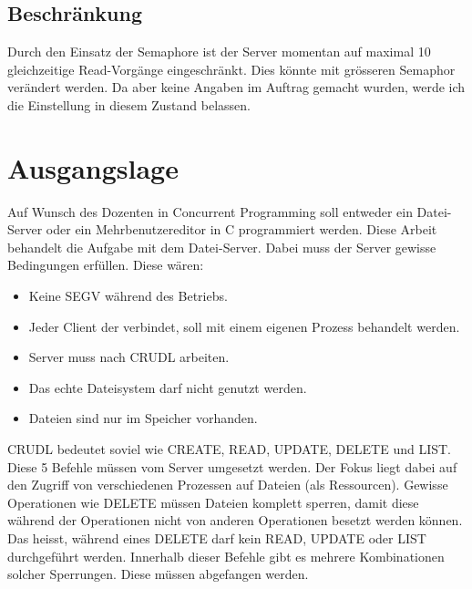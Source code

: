 \documentclass[12pt,a4paper,ngerman]{report}
\begin{document}
\section{Beschränkung}
Durch den Einsatz der Semaphore ist der Server momentan auf maximal 10 gleichzeitige Read-Vorgänge eingeschränkt. Dies könnte mit grösseren Semaphor verändert werden. Da aber keine Angaben im Auftrag gemacht wurden, werde ich die Einstellung in diesem Zustand belassen.
\chapter{Ausgangslage}
Auf Wunsch des Dozenten in Concurrent Programming soll entweder ein Datei-Server oder ein Mehrbenutzereditor in C programmiert werden. Diese Arbeit behandelt die Aufgabe mit dem Datei-Server. Dabei muss der Server gewisse Bedingungen erfüllen. Diese wären:
\begin{itemize}
	\item Keine SEGV während des Betriebs.
	\item Jeder Client der verbindet, soll mit einem eigenen Prozess behandelt werden.
	\item Server muss nach CRUDL arbeiten.
	\item Das echte Dateisystem darf nicht genutzt werden.
	\item Dateien sind nur im Speicher vorhanden.
\end{itemize}

CRUDL bedeutet soviel wie CREATE, READ, UPDATE, DELETE und LIST. Diese 5 Befehle müssen vom Server umgesetzt werden. Der Fokus liegt dabei auf den Zugriff von verschiedenen Prozessen auf Dateien (als Ressourcen). Gewisse Operationen wie DELETE müssen Dateien komplett sperren, damit diese während der Operationen nicht von anderen Operationen besetzt werden können. Das heisst, während eines DELETE darf kein READ, UPDATE oder LIST durchgeführt werden. Innerhalb dieser Befehle gibt es mehrere Kombinationen solcher Sperrungen. Diese müssen abgefangen werden.
\end{document}
